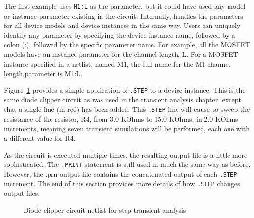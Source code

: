 The first example uses \verb|M1:L| as the parameter, but it could have used any model or instance parameter existing in the circuit. Internally, \Xyce{} handles the parameters for all device models and device instances in the same way.  Users can uniquely identify any parameter by specifying the device instance name, followed by a colon (:), followed by the specific parameter name.  For example, all the MOSFET models have an instance parameter for the channel length, L.  For a MOSFET instance specified in a netlist, named M1, the full name for the M1 channel length parameter is M1:L.  

Figure~\ref{Step_Netlist_1} provides a simple application of \verb|.STEP| to a device instance.  This is the same diode clipper circuit as was used in the transient analysis chapter, except that a single line (in red) has been added.  This \verb|.STEP| line will cause \Xyce{} to sweep the resistance of the resistor, R4, from 3.0 KOhms to 15.0 KOhms, in 2.0 KOhms increments, meaning seven transient simulations will be performed, each one with a different value for R4.

As the circuit is executed multiple times, the resulting output file is a little more sophisticated.  The \verb|.PRINT| statement is still used in much the same way as before.  However, the .prn output file contains the concatenated output of each \verb|.STEP| increment.  The end of this section provides more details of how \texttt{.STEP} changes output files.

\begin{figure}[htbp]
\begin{centering}
\caption{Diode clipper circuit netlist for step transient
analysis\label{Step_Netlist_1}}
\end{centering}
\end{figure}

